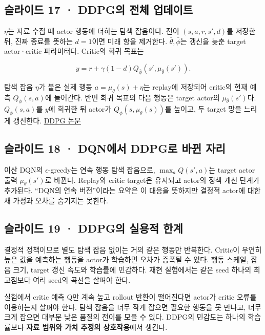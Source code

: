 \documentclass[11pt,a4paper]{article}
\begin{document}
\subsection{슬라이드 17 · DDPG의 전체 업데이트}

$\eta$는 자료 수집 때 actor 행동에 더하는 탐색 잡음이다. 전이 $(s,a,r,s',d)$를 저장한 뒤, 진짜 종료를 뜻하는 $d=1$이면 미래 항을 제거한다. $\bar\theta,\bar\phi$는 갱신을 늦춘 target actor·critic 파라미터다. Critic의 회귀 목표는\par

\[
y=r+\gamma(1-d)Q_{\bar\phi}(s',\mu_{\bar\theta}(s')).
\]

탐색 잡음 $\eta$가 붙은 실제 행동 $a=\mu_\theta(s)+\eta$는 replay에 저장되어 critic의 현재 예측 $Q_\phi(s,a)$에 들어간다. 반면 회귀 목표의 다음 행동은 target actor의 $\mu_{\bar\theta}(s')$다. $Q_\phi(s,a)$를 $y$에 회귀한 뒤 actor가 $Q_\phi(s,\mu_\theta(s))$를 높이고, 두 target 망을 느리게 갱신한다. \href{https://arxiv.org/abs/1509.02971}{DDPG 논문}\par

\subsection{슬라이드 18 · DQN에서 DDPG로 바뀐 자리}

이산 DQN의 $\epsilon$-greedy는 연속 행동 탐색 잡음으로, $\max_aQ(s',a)$는 target actor 출력 $\mu_{\bar\theta}(s')$로 바뀐다. Replay와 critic target은 유지되고 actor의 정책 개선 단계가 추가된다. “DQN의 연속 버전”이라는 요약은 이 대응을 뜻하지만 결정적 actor에 대한 새 가정과 오차를 숨기지는 못한다.\par

\subsection{슬라이드 19 · DDPG의 실용적 한계}

결정적 정책이므로 별도 탐색 잡음 없이는 거의 같은 행동만 반복한다. Critic이 우연히 높은 값을 예측하는 행동을 actor가 학습하면 오차가 증폭될 수 있다. 행동 스케일, 잡음 크기, target 갱신 속도와 학습률에 민감하다. 재현 실험에서는 같은 seed 하나의 최고점보다 여러 seed의 곡선을 살펴야 한다.\par

실험에서 critic 예측 Q만 계속 높고 rollout 반환이 떨어진다면 actor가 critic 오류를 이용하는지 살펴야 한다. 탐색 잡음을 너무 작게 잡으면 필요한 행동을 못 만나고, 너무 크게 잡으면 대부분 낮은 품질의 전이를 모을 수 있다. DDPG의 민감도는 하나의 학습률보다 \textbf{자료 범위와 가치 추정의 상호작용}에서 생긴다.\par
\end{document}
